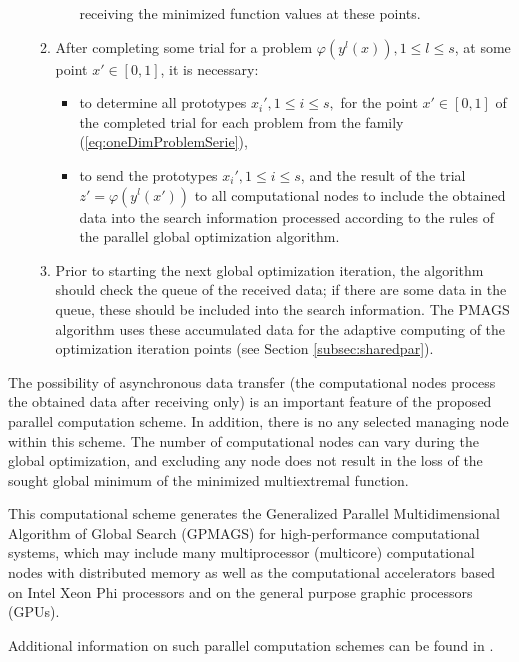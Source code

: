 \documentclass{naco}
\theoremstyle{definition}
\begin{document}
\begin{enumerate}
\begin{enumerate}
\begin{itemize}
      receiving the minimized function values at these points.
    \end{itemize}
    \item After completing some trial for a problem \(\varphi(y^l(x)),1\leq l\leq s\),
    at some point \(x'\in[0,1]\), it is necessary:
    \begin{itemize}
      \item to determine all prototypes \(x_i',1\leq i\leq s,\) for the point $x'\in[0,1]$ of the
      completed trial for each problem from the family (\ref{eq:oneDimProblemSerie}),
      \item to send the prototypes \(x_i',1\leq i\leq s\), and the result of the trial
      \(z'=\varphi(y^l(x'))\) to all computational nodes to include the obtained data into
      the search information processed according to the rules of the parallel global optimization algorithm.
    \end{itemize}
    \item Prior to starting the next global optimization iteration, the algorithm
    should check the queue of the received data; if there are some data in the queue,
    these should be included into the search information. The PMAGS algorithm uses these
    accumulated data for the adaptive computing of the optimization iteration points (see Section \ref{subsec:sharedpar}).
\end{enumerate}
\end{enumerate}
\par
The possibility of asynchronous data transfer (the computational nodes process the obtained
data after receiving only) is an important feature of the proposed parallel computation scheme.
In addition, there is no any selected managing node within this scheme. The number of
computational nodes can vary during the global optimization, and excluding any node does not result
in the loss of the sought global minimum of the minimized multiextremal function.
\par
This computational scheme generates the Generalized Parallel Multidimensional Algorithm of
Global Search (GPMAGS) for high-performance computational systems, which may include many
multiprocessor (multicore) computational nodes with distributed memory as well as the
computational accelerators based on Intel Xeon Phi processors and on the general purpose graphic processors (GPUs).
\par
Additional information on such parallel computation schemes can be found in \cite{gergelSidorov2015}.
\end{document}
